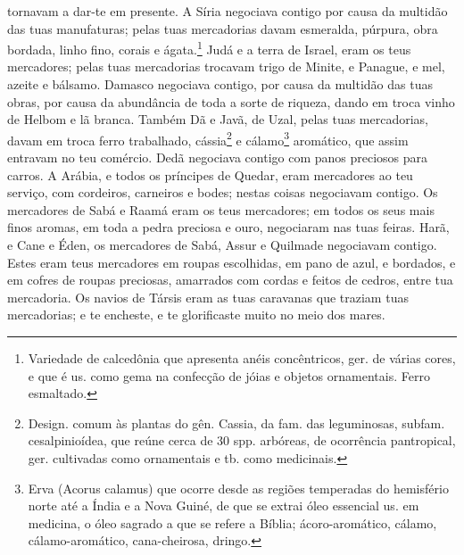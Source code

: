 tornavam a dar-te em presente. A Síria negociava contigo por
causa da multidão das tuas manufaturas; pelas tuas mercadorias davam
esmeralda, púrpura, obra bordada, linho fino, corais e
ágata.\footnote{Variedade de calcedônia que apresenta anéis
concêntricos, ger. de várias cores, e que é us. como gema na
confecção de jóias e objetos ornamentais. Ferro esmaltado.}
Judá e a terra de Israel, eram os teus mercadores; pelas tuas
mercadorias trocavam trigo de Minite, e Panague, e mel, azeite e
bálsamo. Damasco negociava contigo, por causa da multidão das
tuas obras, por causa da abundância de toda a sorte de riqueza,
dando em troca vinho de Helbom e lã branca. Também Dã e Javã,
de Uzal, pelas tuas mercadorias, davam em troca ferro trabalhado,
cássia\footnote{Design. comum às plantas do gên. Cassia, da fam. das
leguminosas, subfam. cesalpinioídea, que reúne cerca de 30 spp.
arbóreas, de ocorrência pantropical, ger. cultivadas como
ornamentais e tb. como medicinais.} e cálamo\footnote{Erva (Acorus
calamus) que ocorre desde as regiões temperadas do hemisfério norte
até a Índia e a Nova Guiné, de que se extrai óleo essencial us. em
medicina, o óleo sagrado a que se refere a Bíblia; ácoro-aromático,
cálamo, cálamo-aromático, cana-cheirosa, dringo.} aromático, que
assim entravam no teu comércio. Dedã negociava contigo com
panos preciosos para carros. A Arábia, e todos os príncipes
de Quedar, eram mercadores ao teu serviço, com cordeiros, carneiros
e bodes; nestas coisas negociavam contigo. Os mercadores de
Sabá e Raamá eram os teus mercadores; em todos os seus mais finos
aromas, em toda a pedra preciosa e ouro, negociaram nas tuas feiras.
Harã, e Cane e Éden, os mercadores de Sabá, Assur e Quilmade
negociavam contigo. Estes eram teus mercadores em roupas
escolhidas, em pano de azul, e bordados, e em cofres de roupas
preciosas, amarrados com cordas e feitos de cedros, entre tua
mercadoria. Os navios de Társis eram as tuas caravanas que
traziam tuas mercadorias; e te encheste, e te glorificaste muito no
meio dos mares.


